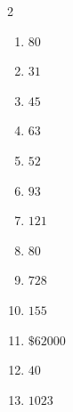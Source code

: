 \documentclass[11pt]{article}
\begin{document}
\begin{keybox}
\begin{multicols}{2}
\small
\begin{enumerate}[leftmargin=*,itemsep=3pt]
  \item $80$
  \item $31$
  \item $45$
  \item $63$
  \item $52$
  \item $93$
  \item $121$
  \item $80$
  \item $728$
  \item $155$
  \item $\$62000$
  \item $40$
  \item $1023$
\end{enumerate}
\end{multicols}
\end{keybox}
\end{document}

